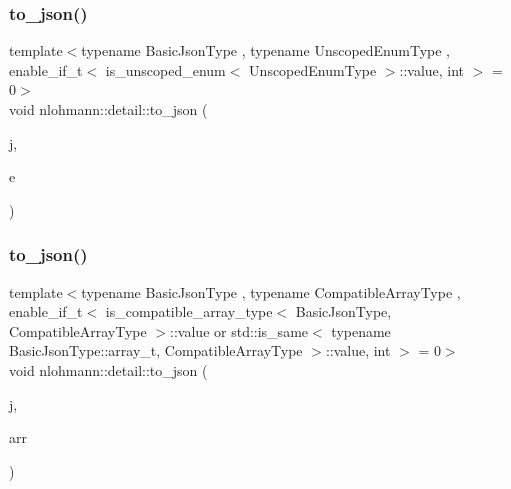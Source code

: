 \subsubsection{\texorpdfstring{to\_json()}{to\_json()}\hspace{0.1cm}{\footnotesize\ttfamily [6/8]}}
{\footnotesize\ttfamily template$<$typename Basic\+Json\+Type , typename Unscoped\+Enum\+Type , enable\+\_\+if\+\_\+t$<$ is\+\_\+unscoped\+\_\+enum$<$ Unscoped\+Enum\+Type $>$\+::value, int $>$  = 0$>$ \\
void nlohmann\+::detail\+::to\+\_\+json (\begin{DoxyParamCaption}\item[{Basic\+Json\+Type \&}]{j,  }\item[{Unscoped\+Enum\+Type}]{e }\end{DoxyParamCaption})\hspace{0.3cm}{\ttfamily [noexcept]}}

\mbox{\label{namespacenlohmann_1_1detail_a3afebc132c5ff83f9cd160e52030fdfd}} 
\subsubsection{\texorpdfstring{to\_json()}{to\_json()}\hspace{0.1cm}{\footnotesize\ttfamily [7/8]}}
{\footnotesize\ttfamily template$<$typename Basic\+Json\+Type , typename Compatible\+Array\+Type , enable\+\_\+if\+\_\+t$<$ is\+\_\+compatible\+\_\+array\+\_\+type$<$ Basic\+Json\+Type, Compatible\+Array\+Type $>$\+::value or std\+::is\+\_\+same$<$ typename Basic\+Json\+Type\+::array\+\_\+t, Compatible\+Array\+Type $>$\+::value, int $>$  = 0$>$ \\
void nlohmann\+::detail\+::to\+\_\+json (\begin{DoxyParamCaption}\item[{Basic\+Json\+Type \&}]{j,  }\item[{const Compatible\+Array\+Type \&}]{arr }\end{DoxyParamCaption})}

\mbox{\label{namespacenlohmann_1_1detail_a6fa2f784014bfc0b62d7a35d51e676c9}} 
